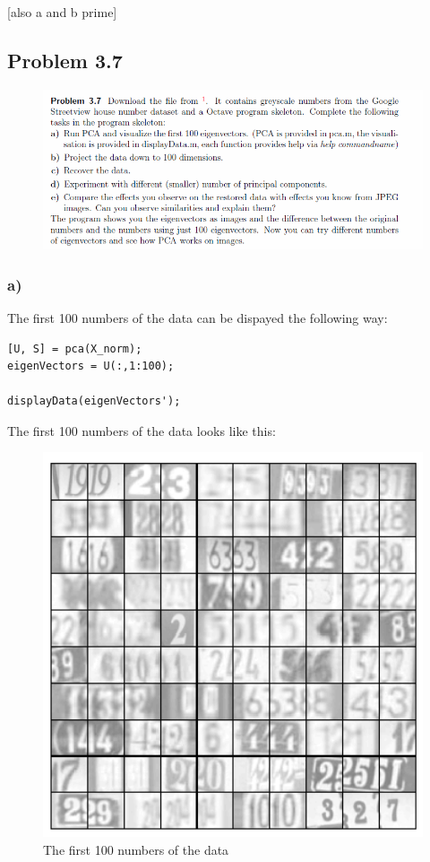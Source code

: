 [also a and b prime]


\subsection{Problem 3.7}


\begin{figure}[!ht]
\includegraphics[width=1\textwidth]{chapters/images/desc-3-7}
\end{figure}


\subsubsection{a)}

The first 100 numbers of the data can be dispayed the following way:

\begin{lstlisting}[caption=Problem 3.7 a)]
[U, S] = pca(X_norm);
eigenVectors = U(:,1:100);

displayData(eigenVectors');
\end{lstlisting}

The first 100 numbers of the data looks like this:

\begin{figure}[!ht]
\includegraphics[width=1\textwidth]{chapters/images/figure-3-7-a}
\caption{The first 100 numbers of the data}
\end{figure}

